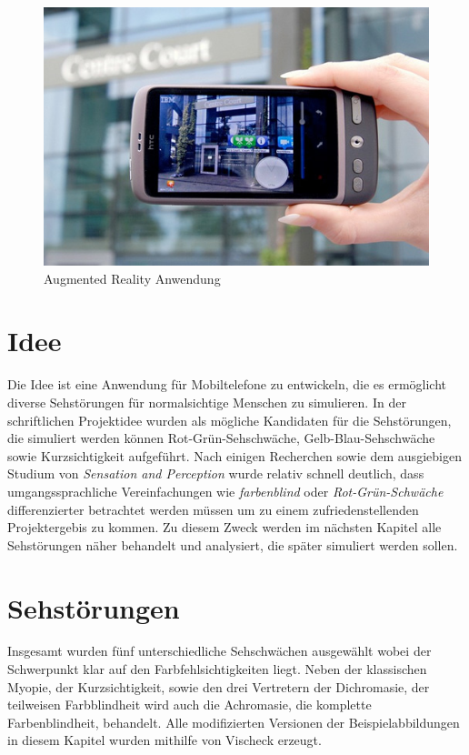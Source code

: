 \documentclass[a4paper]{article}
\begin{document}
\begin{figure}[H]
\centering
\includegraphics[width=\textwidth, trim=0 55 0 65, clip=true]{augmented-reality.jpg}
\caption{Augmented Reality Anwendung}
\label{augmented-reality}
\end{figure}

\newpage

\section*{Idee}
Die Idee ist eine Anwendung für Mobiltelefone zu entwickeln, die es ermöglicht diverse Sehstörungen für normalsichtige Menschen zu simulieren. In der schriftlichen Projektidee wurden als mögliche Kandidaten für die Sehstörungen, die simuliert werden können Rot-Grün-Sehschwäche, Gelb-Blau-Sehschwäche sowie Kurzsichtigkeit aufgeführt. Nach einigen Recherchen sowie dem ausgiebigen Studium von \textit{Sensation and Perception} \cite{Goldstein2009} wurde relativ schnell deutlich, dass umgangssprachliche Vereinfachungen wie \textit{farbenblind} oder \textit{Rot-Grün-Schwäche} differenzierter betrachtet werden müssen um zu einem zufriedenstellenden Projektergebis zu kommen. Zu diesem Zweck werden im nächsten Kapitel alle Sehstörungen näher behandelt und analysiert, die später simuliert werden sollen.

\section*{Sehstörungen}
Insgesamt wurden fünf unterschiedliche Sehschwächen ausgewählt wobei der Schwerpunkt klar auf den Farbfehlsichtigkeiten liegt. Neben der klassischen Myopie, der Kurzsichtigkeit, sowie den drei Vertretern der Dichromasie, der teilweisen Farbblindheit \cite{WP-D} wird auch die Achromasie, die komplette Farbenblindheit, behandelt. Alle modifizierten Versionen der Beispielabbildungen in diesem Kapitel wurden mithilfe von Vischeck \cite{VISCHECK} erzeugt.
\end{document}
